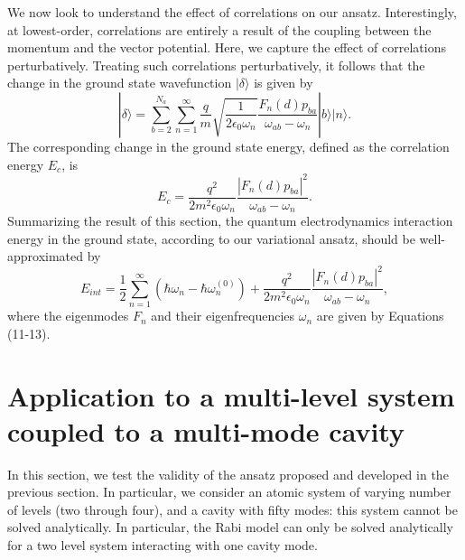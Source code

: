 \documentclass[aps,prb,twocolumn,
	groupedaddress,superscriptaddress,
	amsfonts,amssymb,amsmath,floatfix,
	citeautoscript]{revtex4-1}
\begin{document}
We now look to understand the effect of correlations on our ansatz. Interestingly, at lowest-order, correlations are entirely a result of the coupling between the momentum and the vector potential. Here, we capture the effect of correlations perturbatively. Treating such correlations perturbatively, it follows that the change in the ground state wavefunction $|\delta\rangle$ is given by
\begin{equation}
|\delta\rangle = \sum\limits_{b = 2}^{N_a}\sum\limits_{n=1}^{\infty} \frac{q}{m}\sqrt{\frac{1}{2\epsilon_0\omega_n}}\frac{F_n(d)p_{ba}}{\omega_{ab}-\omega_n}|b\rangle|n\rangle.
\end{equation}
The corresponding change in the ground state energy, defined as the correlation energy $E_c$, is
\begin{equation}
E_{c} = \frac{q^2}{2m^2\epsilon_0\omega_n}\frac{|F_n(d)p_{ba}|^2}{\omega_{ab}-\omega_n}.
\end{equation}
Summarizing the result of this section, the quantum electrodynamics interaction energy in the ground state, according to our variational ansatz, should be well-approximated by
\begin{equation}
E_{int} = \frac{1}{2}\sum\limits_{n=1}^{\infty}\left(\hbar\omega_n - \hbar\omega_n^{(0)} \right) + \frac{q^2}{2m^2\epsilon_0\omega_n}\frac{|F_n(d)p_{ba}|^2}{\omega_{ab}-\omega_n},
\end{equation}
where the eigenmodes $F_n$ and their eigenfrequencies $\omega_n$ are given by Equations (11-13).

\section{Application to a multi-level system coupled to a multi-mode cavity}

In this section, we test the validity of the ansatz proposed and developed in the previous section. In particular, we consider an atomic system of varying number of levels (two through four), and a cavity with fifty modes: this system cannot be solved analytically. In particular, the Rabi model can only be solved analytically for a two level system interacting with one cavity mode. 
\end{document}
